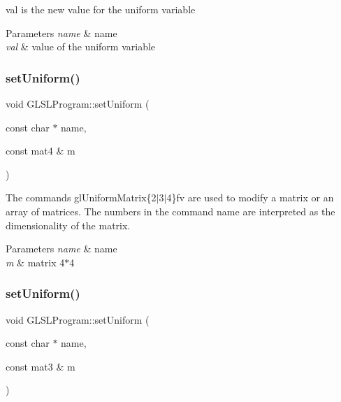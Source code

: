 val is the new value for the uniform variable 


\begin{DoxyParams}{Parameters}
{\em name} & name \\
\hline
{\em val} & value of the uniform variable \\
\hline
\end{DoxyParams}
\hypertarget{class_g_l_s_l_program_a44a7ace14e6c82311526e47264957fa9}{}\label{class_g_l_s_l_program_a44a7ace14e6c82311526e47264957fa9} 
\subsubsection{\texorpdfstring{set\+Uniform()}{setUniform()}\hspace{0.1cm}{\footnotesize\ttfamily [7/8]}}
{\footnotesize\ttfamily void G\+L\+S\+L\+Program\+::set\+Uniform (\begin{DoxyParamCaption}\item[{const char $\ast$}]{name,  }\item[{const mat4 \&}]{m }\end{DoxyParamCaption})}



The commands gl\+Uniform\+Matrix\{2$\vert$3$\vert$4\}fv are used to modify a matrix or an array of matrices. The numbers in the command name are interpreted as the dimensionality of the matrix. 


\begin{DoxyParams}{Parameters}
{\em name} & name \\
\hline
{\em m} & matrix 4$\ast$4 \\
\hline
\end{DoxyParams}
\hypertarget{class_g_l_s_l_program_a69bd967b17f6b06e9fd4772b25e86396}{}\label{class_g_l_s_l_program_a69bd967b17f6b06e9fd4772b25e86396} 
\subsubsection{\texorpdfstring{set\+Uniform()}{setUniform()}\hspace{0.1cm}{\footnotesize\ttfamily [8/8]}}
{\footnotesize\ttfamily void G\+L\+S\+L\+Program\+::set\+Uniform (\begin{DoxyParamCaption}\item[{const char $\ast$}]{name,  }\item[{const mat3 \&}]{m }\end{DoxyParamCaption})}



